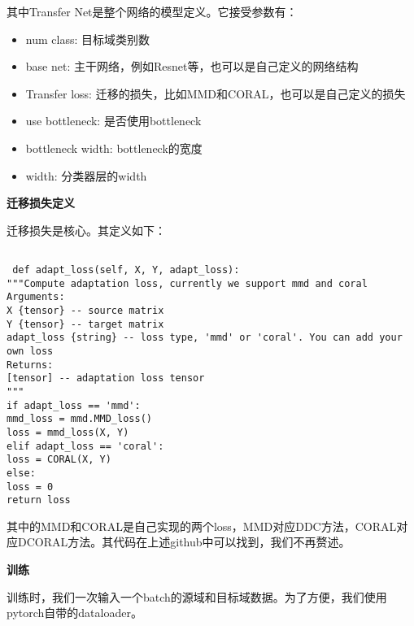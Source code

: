 其中Transfer Net是整个网络的模型定义。它接受参数有：

\begin{itemize}
	\item num class: 目标域类别数
	\item base net: 主干网络，例如Resnet等，也可以是自己定义的网络结构
	\item Transfer loss: 迁移的损失，比如MMD和CORAL，也可以是自己定义的损失
	\item use bottleneck: 是否使用bottleneck
	\item bottleneck width: bottleneck的宽度
	\item width: 分类器层的width
\end{itemize}

\textbf{迁移损失定义}

迁移损失是核心。其定义如下：

\begin{lstlisting}[title=深度迁移网络代码实现, frame=shadowbox]

 def adapt_loss(self, X, Y, adapt_loss):
"""Compute adaptation loss, currently we support mmd and coral
Arguments:
X {tensor} -- source matrix
Y {tensor} -- target matrix
adapt_loss {string} -- loss type, 'mmd' or 'coral'. You can add your own loss
Returns:
[tensor] -- adaptation loss tensor
"""
if adapt_loss == 'mmd':
mmd_loss = mmd.MMD_loss()
loss = mmd_loss(X, Y)
elif adapt_loss == 'coral':
loss = CORAL(X, Y)
else:
loss = 0
return loss
\end{lstlisting}

其中的MMD和CORAL是自己实现的两个loss，MMD对应DDC方法，CORAL对应DCORAL方法。其代码在上述github中可以找到，我们不再赘述。

\textbf{训练}

训练时，我们一次输入一个batch的源域和目标域数据。为了方便，我们使用pytorch自带的dataloader。

